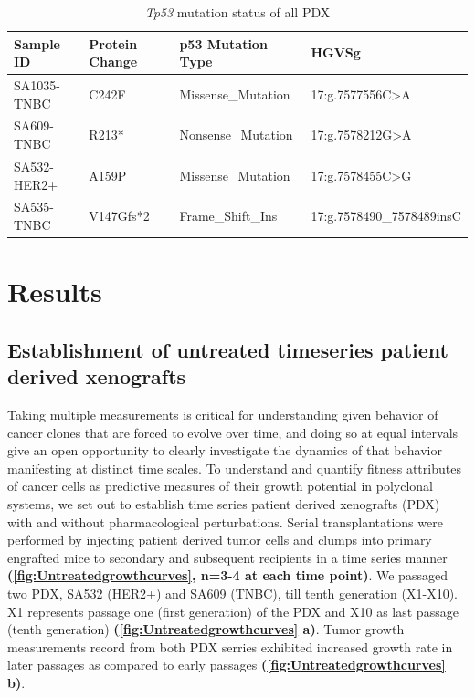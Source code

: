 \begin{table}[htbp]
   \centering
   \caption{\textit{Tp53} mutation status of all PDX}
     \begin{tabular}{|l|l|l|l|}
     \hline
     Sample ID & Protein Change & p53 Mutation Type & HGVSg \\
     \hline
     SA1035-TNBC  & C242F & Missense\_Mutation & 17:g.7577556C>A \\
     SA609-TNBC & R213* & Nonsense\_Mutation & 17:g.7578212G>A \\
     SA532-HER2+ & A159P & Missense\_Mutation & 17:g.7578455C>G \\
     SA535-TNBC & V147Gfs*2 & Frame\_Shift\_Ins & 17:g.7578490\_7578489insC \\
     \hline
     \end{tabular}%
   \label{tab:addlabel}%
 \end{table}%
















\section{Results}

 
\subsection{Establishment of untreated timeseries patient derived xenografts}
Taking multiple measurements is critical for understanding  given behavior of cancer clones that are forced to evolve over time, and doing so at equal intervals give an open opportunity to clearly investigate the dynamics of that behavior manifesting at distinct time scales. 
To understand and quantify fitness attributes of cancer cells as  predictive measures of their growth potential in polyclonal systems, we set out to establish time series patient derived xenografts (PDX) with and without pharmacological perturbations.
Serial transplantations were performed by injecting patient derived tumor cells and clumps into primary engrafted mice to secondary and subsequent recipients in a time series manner \textbf{(\autoref{fig:Untreatedgrowthcurves}, n=3-4 at each time point)}. We passaged two PDX, SA532 (HER2+) and SA609 (TNBC), till tenth generation (X1-X10). X1 represents passage one (first generation) of the PDX and X10 as last passage (tenth generation)   \textbf{(\autoref{fig:Untreatedgrowthcurves} a)}. 
Tumor growth measurements record from both PDX serries exhibited increased growth rate in later passages as compared to early passages \textbf{(\autoref{fig:Untreatedgrowthcurves} b)}.
 
